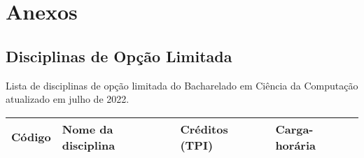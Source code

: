 \section {Anexos}

\subsection {Disciplinas de Opção Limitada}
Lista de disciplinas de opção limitada do Bacharelado em Ciência da Computação atualizado em julho de 2022.

\begin{longtable}{|p{}|p{}|p{}|p{}|}
	\hline
	Código & Nome da disciplina & Créditos (TPI) & Carga-horária\\
	\hline\hline
\end{longtable}
